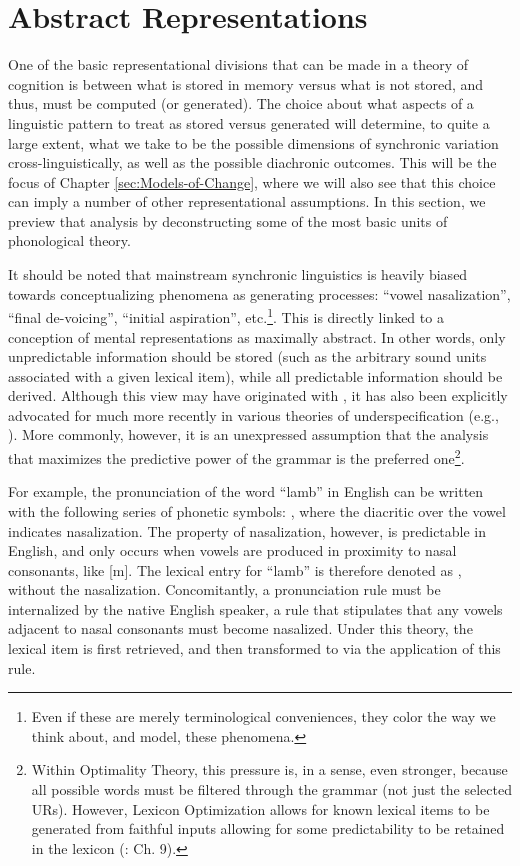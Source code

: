 \section{Abstract Representations}

One of the basic representational divisions that can be made in a
theory of cognition is between what is stored in memory versus what
is not stored, and thus, must be computed (or generated). The choice
about what aspects of a linguistic pattern to treat as stored versus
generated will determine, to quite a large extent, what we take to
be the possible dimensions of synchronic variation cross-linguistically,
as well as the possible diachronic outcomes. This will be the focus
of Chapter \ref{sec:Models-of-Change}, where we will also see that
this choice can imply a number of other representational assumptions.
In this section, we preview that analysis by deconstructing some of
the most basic units of phonological theory.

It should be noted that mainstream synchronic linguistics is heavily
biased towards conceptualizing phenomena as generating processes:
“vowel nasalization”, “final de-voicing”, “initial
aspiration”, etc.\footnote{Even if these are merely terminological conveniences, they color the
way we think about, and model, these phenomena.}. This is directly linked to a conception of mental representations
as maximally abstract. In other words, only unpredictable information
should be stored (such as the arbitrary sound units associated with
a given lexical item), while all predictable information should be
derived. Although this view may have originated with \citet{Chomsky1968},
it has also been explicitly advocated for much more recently in various
theories of underspecification (e.g., \citealt{archangeli1988aspects,Steriade1995a}).
More commonly, however, it is an unexpressed assumption that the analysis
that maximizes the predictive power of the grammar is the preferred
one\footnote{Within Optimality Theory, this pressure is, in a sense, even stronger,
because all possible words must be filtered through the grammar (not
just the selected URs). However, Lexicon Optimization allows for known
lexical items to be generated from faithful inputs allowing for some
predictability to be retained in the lexicon (\citealt{Prince2004}:
Ch. 9). }.

For example, the pronunciation of the word “lamb” in English
can be written with the following series of phonetic symbols: \textipa{[læ̃m]},
where the diacritic over the vowel indicates nasalization. The property
of nasalization, however, is predictable in English, and only occurs
when vowels are produced in proximity to nasal consonants, like {[}m{]}.
The lexical entry for “lamb” is therefore denoted as ,
without the nasalization. Concomitantly, a pronunciation rule must
be internalized by the native English speaker, a rule that stipulates
that any vowels adjacent to nasal consonants must become nasalized.
Under this theory, the lexical item  is first retrieved,
and then transformed to \textipa{[læ̃m]} via the application of
this rule. 

